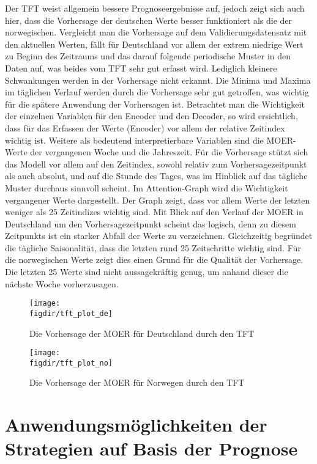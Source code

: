 Der \ac{TFT} weist allgemein bessere Prognoseergebnisse auf, jedoch zeigt sich auch hier, dass die Vorhersage der deutschen Werte besser funktioniert als die der norwegischen.
Vergleicht man die Vorhersage auf dem Validierungsdatensatz mit den aktuellen Werten, fällt für Deutschland vor allem der extrem niedrige Wert zu Beginn des Zeitraums und das darauf folgende periodische Muster in den Daten auf, was beides vom \ac{TFT} sehr gut erfasst wird.
Lediglich kleinere Schwankungen werden in der Vorhersage nicht erkannt.
Die Minima und Maxima im täglichen Verlauf werden durch die Vorhersage sehr gut getroffen, was wichtig für die spätere Anwendung der Vorhersagen ist.
Betrachtet man die Wichtigkeit der einzelnen Variablen für den Encoder und den Decoder, so wird ersichtlich, dass für das Erfassen der Werte (Encoder) vor allem der relative Zeitindex wichtig ist.
Weitere als bedeutend interpretierbare Variablen sind die \ac{MOER}-Werte der vergangenen Woche und die Jahreszeit.
Für die Vorhersage stützt sich das Modell vor allem auf den Zeitindex, sowohl relativ zum Vorhersagezeitpunkt als auch absolut, und auf die Stunde des Tages, was im Hinblick auf das tägliche Muster durchaus sinnvoll scheint.
Im Attention-Graph wird die Wichtigkeit vergangener Werte dargestellt.
Der Graph zeigt, dass vor allem Werte der letzten weniger als 25 Zeitindizes wichtig sind.
Mit Blick auf den Verlauf der \ac{MOER} in Deutschland um den Vorhersagezeitpunkt scheint das logisch, denn zu diesem Zeitpunkts ist ein starker Abfall der Werte zu verzeichnen.
Gleichzeitig begründet die tägliche Saisonalität, dass die letzten rund 25 Zeitschritte wichtig sind.
Für die norwegischen Werte zeigt dies einen Grund für die Qualität der Vorhersage.
Die letzten 25 Werte sind nicht aussagekräftig genug, um anhand dieser die nächste Woche vorherzusagen.
\begin{figure}
 \caption{Die Vorhersage der MOER für Deutschland durch den TFT}
 {\texttt{[image: \\figdir/tft\_plot\_de]}}
 \label{FIG:}
\end{figure}

\begin{figure}
 \caption{Die Vorhersage der MOER für Norwegen durch den TFT}
 {\texttt{[image: \\figdir/tft\_plot\_no]}}
 \label{FIG:}
\end{figure}
\chapter{Anwendungsmöglichkeiten der Strategien auf Basis der Prognose}
